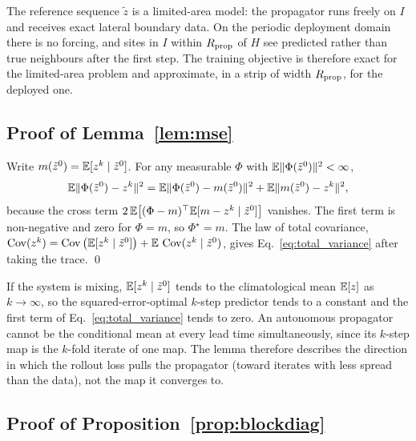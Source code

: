 \begin{remark}
The reference sequence $\tilde z$ is a limited-area model: the
propagator runs freely on $I$ and receives exact lateral boundary data.
On the periodic deployment domain there is no forcing, and sites in $I$
within $R_{\mathrm{prop}}$ of $H$ see predicted rather than true neighbours after
the first step. The training objective is therefore exact for the
limited-area problem and approximate, in a strip of width $R_{\mathrm{prop}}$, for
the deployed one.
\end{remark}

\subsection{Proof of Lemma~\ref{lem:mse}}

Write $m(\tilde z^0)=\mathbb{E}[z^k\mid\tilde z^0]$. For any measurable $\Phi$
with $\mathbb{E}\|\Phi(\tilde z^0)\|^2<\infty$,
\[
  \mathbb{E}\|\Phi(\tilde z^0)-z^k\|^2
  = \mathbb{E}\|\Phi(\tilde z^0)-m(\tilde z^0)\|^2
  + \mathbb{E}\|m(\tilde z^0)-z^k\|^2,
\]
because the cross term
$2\,\mathbb{E}\big[(\Phi-m)^{\top}\mathbb{E}[m-z^k\mid\tilde z^0]\big]$ vanishes. The
first term is non-negative and zero for $\Phi=m$, so $\Phi^\star=m$. The
law of total covariance,
$\operatorname{Cov}(z^k)=\operatorname{Cov}\big(\mathbb{E}[z^k\mid\tilde z^0]\big)+\mathbb{E}\,\operatorname{Cov}(z^k\mid\tilde z^0)$,
gives Eq.~\eqref{eq:total_variance} after taking the trace. \qed

\begin{remark}
If the system is mixing, $\mathbb{E}[z^k\mid\tilde z^0]$ tends to the
climatological mean $\mathbb{E}[z]$ as $k\to\infty$, so the squared-error-optimal
$k$-step predictor tends to a constant and the first term of
Eq.~\eqref{eq:total_variance} tends to zero. An autonomous propagator
cannot be the conditional mean at every lead time simultaneously, since
its $k$-step map is the $k$-fold iterate of one map. The lemma therefore
describes the direction in which the rollout loss pulls the propagator
(toward iterates with less spread than the data), not the map it
converges to.
\end{remark}

\subsection{Proof of Proposition~\ref{prop:blockdiag}}


